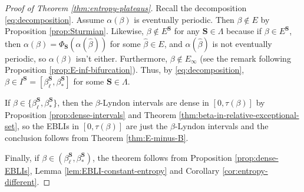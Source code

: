 \documentclass[11pt]{amsart}
\theoremstyle{definition}
\theoremstyle{remark}
\numberwithin{equation}{section}
\newcommand{\cs}{ {\mathbf{S}}}
\newcommand{\f}{\infty}
\newcommand{\al}{\alpha}
\newcommand{\La}{\Lambda}
\begin{document}
\begin{proof}[Proof of Theorem \ref{thm:entropy-plateaus}]
Recall the decomposition \eqref{eq:decomposition}.
Assume $\al(\beta)$ is eventually periodic. Then $\beta\not\in E$ by Proposition \ref{prop:Sturmian}. Likewise, $\beta\not\in E^\cs$ for any $\cs\in\La$ because if $\beta\in E^\cs$, then $\al(\beta)=\Phi_\cs(\al(\hat{\beta}))$ for some $\hat{\beta}\in E$, and $\al(\hat{\beta})$ is not eventually periodic, so $\al(\beta)$ isn't either. Furthermore, $\beta\not\in E_\f$ (see the remark following Proposition \ref{prop:E-inf-bifurcation}). Thus, by \eqref{eq:decomposition}, $\beta\in I^\cs=[\beta_\ell^\cs,\beta_*^\cs]$ for some $\cs\in\La$.

If $\beta\in\{\beta_\ell^\cs,\beta_*^\cs\}$, then the $\beta$-Lyndon intervals are dense in $[0,\tau(\beta)]$ by Proposition \ref{prop:dense-intervals} and Theorem \ref{thm:beta-in-relative-exceptional-set}, so the EBLIs in $[0,\tau(\beta)]$ are just the $\beta$-Lyndon intervals and the conclusion follows from Theorem \ref{thm:E-minus-B}.

Finally, if $\beta\in(\beta_\ell^\cs,\beta_*^\cs)$, the theorem follows from Proposition \ref{prop:dense-EBLIs}, Lemma \ref{lem:EBLI-constant-entropy} and Corollary \ref{cor:entropy-different}.
\end{proof}
\end{document}
